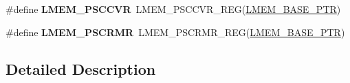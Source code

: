 \begin{DoxyCompactItemize}
\item 
\hypertarget{group___l_m_e_m___register___accessor___macros_gad07c6e59b9a1dd68ed98263527012af4}{}\#define {\bfseries L\+M\+E\+M\+\_\+\+P\+S\+C\+C\+V\+R}~L\+M\+E\+M\+\_\+\+P\+S\+C\+C\+V\+R\+\_\+\+R\+E\+G(\hyperlink{group___l_m_e_m___peripheral_ga1666dc97b6d56a81369b43b1ee4ae240}{L\+M\+E\+M\+\_\+\+B\+A\+S\+E\+\_\+\+P\+T\+R})\label{group___l_m_e_m___register___accessor___macros_gad07c6e59b9a1dd68ed98263527012af4}

\item 
\hypertarget{group___l_m_e_m___register___accessor___macros_ga796306fe3029593407002d981547613d}{}\#define {\bfseries L\+M\+E\+M\+\_\+\+P\+S\+C\+R\+M\+R}~L\+M\+E\+M\+\_\+\+P\+S\+C\+R\+M\+R\+\_\+\+R\+E\+G(\hyperlink{group___l_m_e_m___peripheral_ga1666dc97b6d56a81369b43b1ee4ae240}{L\+M\+E\+M\+\_\+\+B\+A\+S\+E\+\_\+\+P\+T\+R})\label{group___l_m_e_m___register___accessor___macros_ga796306fe3029593407002d981547613d}

\end{DoxyCompactItemize}


\subsection{Detailed Description}
